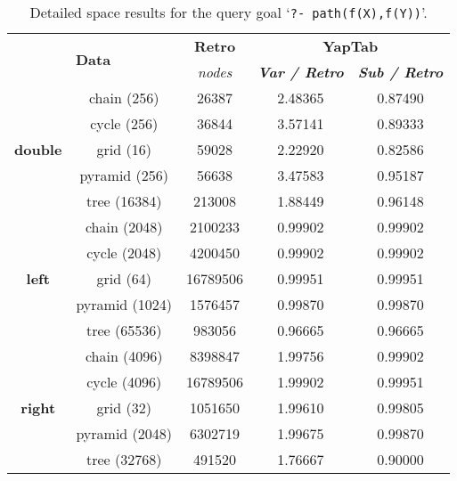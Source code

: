 \begin{table}[ht]
\centering
\footnotesize{
  \begin{tabular}{cc|c|cc}
   \hline
    \hline
    \multicolumn{2}{c|}{\multirow{2}{*}{\small{\textbf{Data}}}} & \textbf{\small{Retro}} & \multicolumn{2}{c}{\small{\textbf{YapTab}}} \\
     \multicolumn{2}{c|}{} & \scriptsize{\textit{nodes}} & \textbf{\textit{\scriptsize{Var / Retro}}} & \textbf{\textit{\scriptsize{Sub / Retro}}} \\
   \hline
   \hline

\multirow{5}{*}{\textbf{double}} &  chain (256) &  26387 &  2.48365 & 0.87490 \\
&  cycle (256) &  36844 &  3.57141 & 0.89333 \\
&  grid (16) &  59028 &  2.22920 & 0.82586 \\
&  pyramid (256) &  56638 &  3.47583 & 0.95187 \\
&  tree (16384) &  213008 &  1.88449 & 0.96148 \\
\hline
\multirow{5}{*}{\textbf{left}} &  chain (2048) &  2100233 &  0.99902 & 0.99902 \\
&  cycle (2048) &  4200450 &  0.99902 & 0.99902 \\
&  grid (64) &  16789506 &  0.99951 & 0.99951 \\
&  pyramid (1024) &  1576457 &  0.99870 & 0.99870 \\
&  tree (65536) &  983056 &  0.96665 & 0.96665 \\
\hline
\multirow{5}{*}{\textbf{right}} &  chain (4096) &  8398847 &  1.99756 & 0.99902 \\
&  cycle (4096) &  16789506 &  1.99902 & 0.99951 \\
&  grid (32) &  1051650 &  1.99610 & 0.99805 \\
&  pyramid (2048) &  6302719 &  1.99675 & 0.99870 \\
&  tree (32768) &  491520 &  1.76667 & 0.90000 \\
\hline
\hline
\end{tabular}
}
\caption{Detailed space results for the query goal `\texttt{?-~path(f(X),f(Y))}'.}
\label{tbl:results_detail_stst_space}
\end{table}
